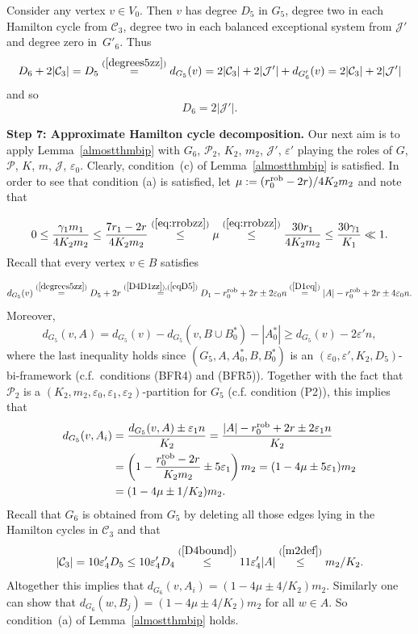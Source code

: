 \documentclass{memo-l}
\def\COMMENT#1{}
\def\cC{\mathcal{C}}
\def\cP{\mathcal{P}}
\def\eps{\varepsilon}
\def\cJ{\mathcal{J}}
\numberwithin{section}{chapter}
\numberwithin{equation}{section}
\numberwithin{firstthm}{section}
\numberwithin{figure}{section}
\begin{document}
{Consider any vertex $v\in V_0$. Then $v$ has degree $D_5$ in $G_5$, degree two in each Hamilton cycle from $\cC_3$,
degree two in each balanced exceptional system from $\cJ'$ and degree zero in~$G'_6$.
Thus
$$D_6+2|\cC_3|=D_5\stackrel{(\ref{degrees5zz})}{=}d_{G_5}(v)=2|\cC_3|+2|\cJ'|+d_{G'_6}(v)=2|\cC_3|+2|\cJ'|$$
and so
\begin{equation}\label{eq:D5zz}
D_6=2|\cJ'|.
\end{equation}



\noindent\textbf{Step 7: Approximate Hamilton cycle decomposition.}
Our next aim is to apply Lemma~\ref{almostthmbip} with $G_6$, $\cP_2$, $K_2$, $m_2$, $\cJ'$, $\eps'$ playing the
roles of $G$, $\cP$, $K$, $m$, $\cJ$, $\eps_0$.
 Clearly, condition~(c) of Lemma~\ref{almostthmbip} is satisfied.
In order to see that condition (a) is satisfied, let $\mu:=(r^{\rm rob}_0-2r)/4K_2m_2$ and note that%
   \COMMENT{Daniela changed inequality below, before had $1/K_2\ll \mu\ll \eps$, but we don't need this for Lemma~\ref{almostthmbip}}
$$
0\le \frac{\gamma_1 m_1}{4K_2m_2}\leq
\frac{7r_1-2r}{4K_2m_2}\stackrel{(\ref{eq:rrobzz})}{\le} \mu \stackrel{(\ref{eq:rrobzz})}{\le} \frac{30r_1}{4K_2m_2}\le
\frac{30\gamma_1 }{K_1}\ll 1.
$$
Recall that every vertex $v\in B$ satisfies%
\COMMENT{osthus adapted calculation to be an `equality' and not just a lower bound}
$$d_{G_5}(v) \stackrel{(\ref{degrees5zz})}{=} D_5+2r \stackrel{(\ref{D4D1zz}),(\ref{eqD5})}{=} D_1-r^{\rm rob}_0+2r \pm 2 \eps_0 n
\stackrel{(\ref{D1eq})}{=}  |A| -r^{\rm rob}_0+2r \pm 4 \eps_0 n.
$$
Moreover,
$$d_{G_5}(v,A)= d_{G_5}(v)-d_{G_5}(v,B\cup B^*_0)-|A^*_0|\ge d_{G_5}(v)-2\eps ' n,$$
where the last inequality holds since $(G_5,A,A^*_0,B,B^*_0)$ is an $(\eps_0,\eps ',K_2,D_5)$-bi-framework (c.f.~conditions (BFR4) and (BFR5)).
Together with the fact that $\cP_2$ is a $(K_2,m_2,\eps_0,\eps_1,\eps_2)$-partition for $G_5$ (c.f. condition (P2)),
this implies that
\begin{align*}
d_{G_5}(v,A_i) & =\frac{d_{G_5}(v,A)\pm \eps_1 n}{K_2}
=\frac{|A|-r^{\rm rob}_0+2r\pm 2\eps_1 n}{K_2} \\ &=
\left(1-\frac{r^{\rm rob}_0-2r}{K_2m_2}\pm 5\eps_1\right)m_2
 =(1-4\mu\pm 5\eps_1)m_2 \\ & =(1-4\mu\pm 1/K_2)m_2.
\end{align*}
Recall that $G_6$ is obtained from $G_5$ by deleting all those edges lying in the Hamilton cycles in $\cC_3$ and that
$$
|\cC_3|= 10\eps'_4 D_5 \leq 10\eps'_4 D_4
 \stackrel{(\ref{D4bound})}{\le} 11 \eps'_4 |A| \stackrel{(\ref{m2def})}{\leq} m_2/K_2.
$$
Altogether this implies that
$d_{G_6}(v,A_i)=(1-4\mu\pm 4/K_2)m_2$. Similarly one can show that $d_{G_6}(w,B_j)=(1-4\mu\pm 4/K_2)m_2$ for all $w\in A$.
So condition~(a) of Lemma~\ref{almostthmbip} holds.

}
\end{document}
